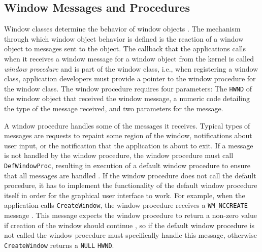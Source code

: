		\subsection{Window Messages and Procedures}
			Window classes determine the behavior of window objects \cite{creatingwindow}. The mechanism
			through which window object behavior is defined is the reaction of
			a window object to messages sent to the object. The callback that
			the applications calls when it receives a window message
			for a window object from the kernel is called
			\textit{window procedure} \cite{aboutwinproc} and is part of the window class, i.e., when
			registering a window class, application developers must provide a
			pointer to the window procedure for the window class. The window
			procedure requires four parameters: The \texttt{HWND} of the window
			object that received the window message, a numeric code detailing the
			type of the message received, and two parameters for the message.
			\cite{aboutwinproc}

			A window procedure handles some of the messages it receives.
			Typical types of messages are requests to repaint some region of
			the window, notifications about user input, or the notification
			that the application is about to exit. If a message is not handled
			by the window procedure, the window procedure must call
			\texttt{DefWindowProc}, resulting in execution of a default window
			procedure to ensure that all messages are handled
			\cite{aboutwinproc}. If the window procedure does not call the
			default procedure, it has to implement the functionality of the
			default window procedure itself in order for the graphical user
			interface to work. For example, when the application calls
			\texttt{CreateWindow},
			the window procedure receives a \texttt{WM\_NCCREATE}
			message \cite{createwindow}. This message expects the window procedure
			to return a non-zero value if creation of the window should continue
			\cite{wmnccreate},
			so if the default window procedure is not called the window procedure
			must specifically handle this message, otherwise \texttt{CreateWindow}
			returns a \texttt{NULL} \texttt{HWND}.

